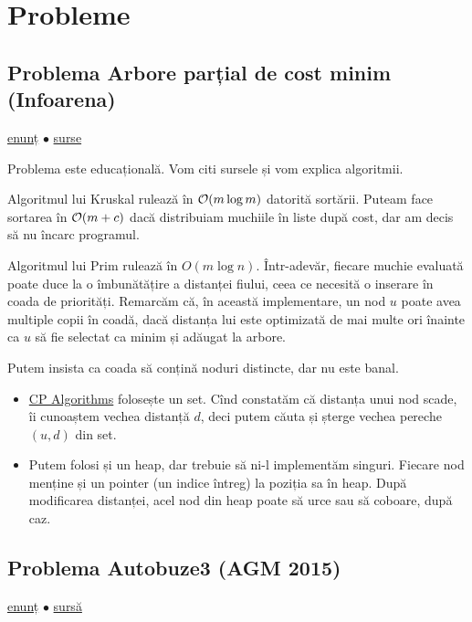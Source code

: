 \documentclass[../main.tex]{subfiles}
\begin{document}
\section{Probleme}

\subsection{Problema Arbore parțial de cost minim (Infoarena)}
\label{problem:apm}

\href{https://www.infoarena.ro/problema/apm}{enunț}
$\bullet$
\hyperref[code:apm]{surse}

Problema este educațională. Vom citi sursele și vom explica algoritmii.

Algoritmul lui Kruskal rulează în $\mathcal{O}(m \log m)$ datorită sortării. Puteam face sortarea în $\mathcal{O}(m + c)$ dacă distribuiam muchiile în liste după cost, dar am decis să nu încarc programul.

Algoritmul lui Prim rulează în $O(m \log n)$. Într-adevăr, fiecare muchie evaluată poate duce la o îmbunătățire a distanței fiului, ceea ce necesită o inserare în coada de priorități. Remarcăm că, în această implementare, un nod $u$ poate avea multiple copii în coadă, dacă distanța lui este optimizată de mai multe ori înainte ca $u$ să fie selectat ca minim și adăugat la arbore.

Putem insista ca coada să conțină noduri distincte, dar nu este banal.

\begin{itemize}
  \item \href{https://cp-algorithms.com/graph/mst_prim.html#sparse-graphs-om-log-n}{CP Algorithms} folosește un set. Cînd constatăm că distanța unui nod scade, îi cunoaștem vechea distanță $d$, deci putem căuta și șterge vechea pereche $(u, d)$ din set.

  \item Putem folosi și un heap, dar trebuie să ni-l implementăm singuri. Fiecare nod menține și un pointer (un indice întreg) la poziția sa în heap. După modificarea distanței, acel nod din heap poate să urce sau să coboare, după caz.
\end{itemize}

\subsection{Problema Autobuze3 (AGM 2015)}
\label{problem:autobuze3}

\href{https://infoarena.ro/problema/autobuze3}{enunț}
$\bullet$
\hyperref[code:autobuze3]{sursă}
\end{document}
